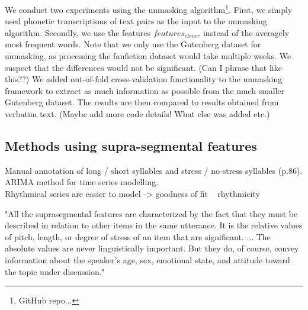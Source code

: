 We conduct two experiments using the unmasking algorithm\footnote{GitHub repo...}.
First, we simply used phonetic transcriptions of text pairs as the input to the unmasking algorithm.
Secondly, we use the features $features_{clever}$ instead of the averagely most frequent words.
Note that we only use the Gutenberg dataset for unmasking, as processing the fanfiction dataset would take multiple weeks.
We suspect that the differences would not be significant. (Can I phrase that like this??)
We added out-of-fold cross-validation functionality to the unmasking framework to extract as much information as possible from the much smaller Gutenberg dataset.
The results are then compared to results obtained from verbatim text.
(Maybe add more code details! What else was added etc.)


\subsection{Methods using supra-segmental features}
Manual annotation of long / short syllables and stress / no-stress syllables (p.86).
ARIMA method for time series modelling.\\
Rhythmical series are easier to model -> goodness of fit ~ rhythmicity


"All the suprasegmental features are characterized by the fact that they must be described in relation to other items in the same utterance.
It is the relative values of pitch, length, or degree of stress of an item that are significant.
... The absolute values are never linguistically important.
But they do, of course, convey information about the speaker's age, sex, emotional state, and attitude toward the topic under discussion."\cite{ladefoged2014courseInPhonetics}

